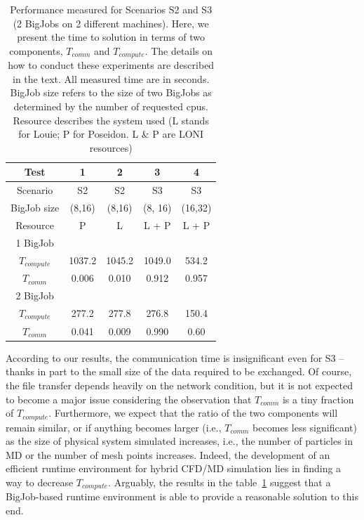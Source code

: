 \documentclass[conference,final]{IEEEtran}
\newcommand{\jhanote}[1]{ {\textcolor{red} { ***Jha: #1 }}}
\newcommand{\jhanote}[1]{}
\begin{document}
\begin{table}[!h]
\begin{center}
  \caption{\small Performance measured for Scenarios S2 and S3 (2
    BigJobs on 2 different machines).  Here, we present the time to
    solution in terms of two components, ${T_{comm}}$ and
   ${T_{compute}}$.  The details on how to conduct these experiments
    are described in the text.  All measured time are in seconds.
    BigJob size refers to the size of two BigJobs as determined by the
    number of requested cpus. Resource describes the system used (L
    stands for Louie; P for Poseidon. L \& P are LONI resources) }
\label{table:TwoBigJobs}
\begin{tabular}{ c || c  c  c  c}
\hline
Test & 1 & 2 & 3 & 4  \\

\hline
Scenario & S2 & S2 & S3 & S3 \\
BigJob size & (8,16)  & (8,16) & (8, 16) & (16,32) \\
Resource & P  & L  &  L + P & L + P \\
\hline
1 BigJob &   & & & \\
${T_{compute}}$ & 1037.2& 1045.2 & 1049.0 & 534.2\\
${T_{comm}}$ & 0.006 & 0.010 & 0.912 & 0.957 \\
\hline
2 BigJob  &   & & & \\
${T_{compute}}$ & 277.2 & 277.8& 276.8 & 150.4 \\
${T_{comm}}$ & 0.041 & 0.009 &  0.990 & 0.60 \\
\hline
\end{tabular}
\end{center}
\end{table}


According to our results, the communication time is insignificant even
for S3 --  thanks in part to the small size of the data required to be
exchanged.  Of course, the file transfer depends heavily on the
network condition, but it is not expected to become a major issue
considering the observation that ${T_{comm}}$ is a tiny fraction of
${T_{compute}}$.  Furthermore, we expect that the ratio of the two
components will remain similar, or if anything becomes larger (i.e.,
${T_{comm}}$ becomes less significant) as the size of physical system
simulated increases, i.e., the number of particles in MD or the number
of mesh points increases.  Indeed, the development of an efficient
runtime environment for hybrid CFD/MD simulation lies in finding a way
to decrease ${T_{compute}}$.  Arguably, the results in the
table~\ref{table:TwoBigJobs} suggest that a BigJob-based runtime
environment is able to provide a reasonable solution to this end.
\end{document}
